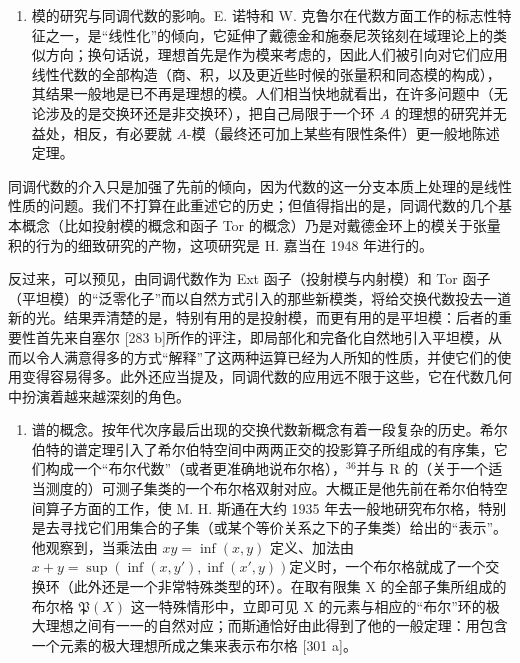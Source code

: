 \begin{enumerate}
\def\labelenumi{\Alph{enumi})}
\setcounter{enumi}{3}
\tightlist
\item
  模的研究与同调代数的影响。E. 诺特和 W. 克鲁尔在代数方面工作的标志性特征之一，是“线性化”的倾向，它延伸了戴德金和施泰尼茨铭刻在域理论上的类似方向；换句话说，理想首先是作为模来考虑的，因此人们被引向对它们应用线性代数的全部构造（商、积，以及更近些时候的张量积和同态模的构成），其结果一般地是已不再是理想的模。人们相当快地就看出，在许多问题中（无论涉及的是交换环还是非交换环），把自己局限于一个环 \(A\) 的理想的研究并无益处，相反，有必要就 \(A\)-模（最终还可加上某些有限性条件）更一般地陈述定理。
\end{enumerate}

同调代数的介入只是加强了先前的倾向，因为代数的这一分支本质上处理的是线性性质的问题。我们不打算在此重述它的历史；但值得指出的是，同调代数的几个基本概念（比如投射模的概念和函子 Tor 的概念）乃是对戴德金环上的模关于张量积的行为的细致研究的产物，这项研究是 H. 嘉当在 1948 年进行的。

反过来，可以预见，由同调代数作为 Ext 函子（投射模与内射模）和 Tor 函子（平坦模）的“泛零化子”而以自然方式引入的那些新模类，将给交换代数投去一道新的光。结果弄清楚的是，特别有用的是投射模，而更有用的是平坦模：后者的重要性首先来自塞尔 {[}283 b{]}所作的评注，即局部化和完备化自然地引入平坦模，从而以令人满意得多的方式“解释”了这两种运算已经为人所知的性质，并使它们的使用变得容易得多。此外还应当提及，同调代数的应用远不限于这些，它在代数几何中扮演着越来越深刻的角色。

\begin{enumerate}
\def\labelenumi{\Alph{enumi})}
\setcounter{enumi}{4}
\tightlist
\item
  谱的概念。按年代次序最后出现的交换代数新概念有着一段复杂的历史。希尔伯特的谱定理引入了希尔伯特空间中两两正交的投影算子所组成的有序集，它们构成一个“布尔代数”（或者更准确地说布尔格），\(^{36}\)并与 R 的（关于一个适当测度的）可测子集类的一个布尔格双射对应。大概正是他先前在希尔伯特空间算子方面的工作，使 M. H. 斯通在大约 1935 年去一般地研究布尔格，特别是去寻找它们用集合的子集（或某个等价关系之下的子集类）给出的“表示”。他观察到，当乘法由 \(xy = \inf(x, y)\) 定义、加法由 \(x + y = \sup(\inf(x, y'), \inf(x', y))\)定义时，一个布尔格就成了一个交换环（此外还是一个非常特殊类型的环）。在取有限集 X 的全部子集所组成的布尔格 \(\mathfrak{P}(X)\) 这一特殊情形中，立即可见 X 的元素与相应的“布尔”环的极大理想之间有一一的自然对应；而斯通恰好由此得到了他的一般定理：用包含一个元素的极大理想所成之集来表示布尔格 {[}301 a{]}。
\end{enumerate}


